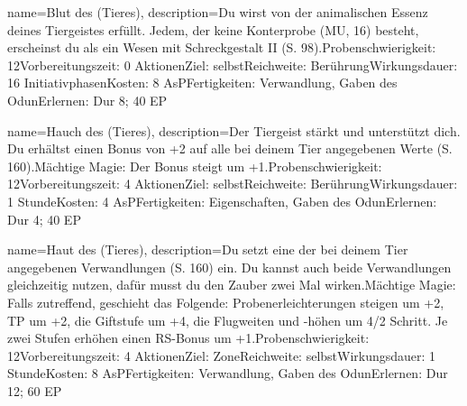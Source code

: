 {
    name={Blut des (Tieres)},
    description={Du wirst von der animalischen Essenz deines Tiergeistes erfüllt. Jedem, der keine Konterprobe (MU, 16) besteht, erscheinst du als ein Wesen mit Schreckgestalt II (S. 98).\newline Probenschwierigkeit: 12\newline Vorbereitungszeit: 0 Aktionen\newline Ziel: selbst\newline Reichweite: Berührung\newline Wirkungsdauer: 16 Initiativphasen\newline Kosten: 8 AsP\newline Fertigkeiten: Verwandlung, Gaben des Odun\newline Erlernen: Dur 8; 40 EP}
}


{
    name={Hauch des (Tieres)},
    description={Der Tiergeist stärkt und unterstützt dich. Du erhältst einen Bonus von +2 auf alle bei deinem Tier angegebenen Werte (S. 160).\newline Mächtige Magie: Der Bonus steigt um +1.\newline Probenschwierigkeit: 12\newline Vorbereitungszeit: 4 Aktionen\newline Ziel: selbst\newline Reichweite: Berührung\newline Wirkungsdauer: 1 Stunde\newline Kosten: 4 AsP\newline Fertigkeiten: Eigenschaften, Gaben des Odun\newline Erlernen: Dur 4; 40 EP}
}


{
    name={Haut des (Tieres)},
    description={Du setzt eine der bei deinem Tier angegebenen Verwandlungen (S. 160) ein. Du kannst auch beide Verwandlungen gleichzeitig nutzen, dafür musst du den Zauber zwei Mal wirken.\newline Mächtige Magie: Falls zutreffend, geschieht das Folgende: Probenerleichterungen steigen um +2, TP um +2, die Giftstufe um +4, die Flugweiten  und -höhen um 4/2 Schritt. Je zwei Stufen erhöhen einen RS-Bonus um +1.\newline Probenschwierigkeit: 12\newline Vorbereitungszeit: 4 Aktionen\newline Ziel: Zone\newline Reichweite: selbst\newline Wirkungsdauer: 1 Stunde\newline Kosten: 8 AsP\newline Fertigkeiten: Verwandlung, Gaben des Odun\newline Erlernen: Dur 12; 60 EP}
}


